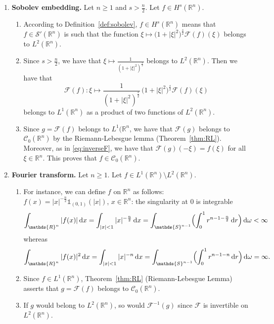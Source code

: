 \documentclass[a4paper, 12pt]{article}
\theoremstyle{plain}
\theoremstyle{definition}
\theoremstyle{remark}
\numberwithin{equation}{section}
\begin{document}
\begin{enumerate}
\item
{\bf Sobolev embedding.} Let $n \ge 1$ and $s>\frac{n}{2}$. Let $f\in H^s({\mathds{R}}^n)$.
%
\begin{enumerate}
\item
According to Definition~\ref{def:sobolev}, $f\in H^s({\mathds{R}}^n)$ means that $f\in {\mathscr{S}}'({\mathds{R}}^n)$ 
is such that the function $\xi\mapsto \bigl(1+|\xi|^2\bigr)^{\frac{s}{2}}{\mathscr{F}}(f)(\xi)$
belongs to $L^2({\mathds{R}}^n)$.
\item
Since $s>\frac{n}{2}$, we have that $\xi\mapsto \frac{1}{(1+|\xi|^2)^{\frac{s}{2}}}$ belongs to $L^2({\mathds{R}}^n)$. Then
we have that 
\[
{\mathscr{F}}(f):\xi\mapsto \frac{1}{(1+|\xi|^2)^{\frac{s}{2}}} \, \bigl(1+|\xi|^2\bigr)^{\frac{s}{2}}{\mathscr{F}}(f)(\xi)
\]
belongs to $L^1({\mathds{R}}^n)$ as a product of two functions of $L^2({\mathds{R}}^n)$.
\item
Since $g={\mathscr{F}}(f)$ belongs to $L^1({\mathds{R}}^n$, we have that ${\mathscr{F}}(g)$ belongs to ${\mathscr{C}}_0({\mathds{R}}^n)$
by the Riemann-Lebesgue lemma (Theorem~\ref{thm:RL}). Moreover, as in \eqref{eq:inverseF}, we have that ${\mathscr{F}}(g)(-\xi)=f(\xi)$
for all $\xi\in{\mathds{R}}^n$. This proves that $f\in {\mathscr{C}}_0({\mathds{R}}^n)$.
\end{enumerate}
%
\item
{\bf Fourier transform.}
Let $n\ge 1$. Let $f\in L^1({\mathds{R}}^n)\setminus L^2({\mathds{R}}^n)$. 
%
\begin{enumerate}
\item
For instance, we can define $f$ on ${\mathds{R}}^n$ as follows: $f(x)=|x|^{-\frac{n}{2}}{\mathds{1}}_{(0,1)}(|x|)$, $x\in{\mathds{R}}^n$:
the singularity at $0$ is integrable 
\[
\int_{{\mathds{R}}^n}|f(x)|\,{\rm d}x=
\int_{|x|<1}|x|^{-\frac{n}{2}}\,{\rm d}x =\int_{{\mathds{S}}^{n-1}}\Bigl(\int_0^1 r^{n-1-\frac{n}{2}}\,{\rm d}r\Bigr)\,{\rm d}\omega <\infty
\]
whereas 
\[
\int_{{\mathds{R}}^n}|f(x)|^2\,{\rm d}x=
\int_{|x|<1}|x|^{-n}\,{\rm d}x =\int_{{\mathds{S}}^{n-1}}\Bigl(\int_0^1 r^{n-1-n}\,{\rm d}r\Bigr)\,{\rm d}\omega =\infty.
\]
\item
Since $f\in L^1({\mathds{R}}^n)$, Theorem~\ref{thm:RL} (Riemann-Lebesgue Lemma) asserts that $g={\mathscr{F}}(f)$
belongs to ${\mathscr{C}}_0({\mathds{R}}^n)$.
\item
If $g$ would belong to $L^2({\mathds{R}}^n)$, so would ${\mathscr{F}}^{-1}(g)$ since ${\mathscr{F}}$ is invertible on $L^2({\mathds{R}}^n)$.

\end{enumerate}
\end{enumerate}
\end{document}
